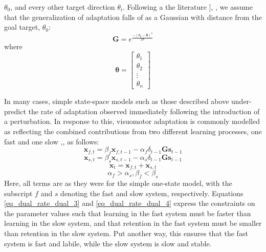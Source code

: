 \documentclass[jou, 11pt, longtable, floatsintext, notab]{apa6}
\begin{document}
$\theta_{0}$, and every other target direction $\theta_{i}$.
Following a the literature \cite{brayanov_motor_2012}],
\cite{poggio_generalization_2004}, we assume that the
generalization of adaptation falls of as a Gaussian with
distance from the goal target, $\theta_{0}$:
\begin{equation}
  \boldsymbol{G} = e^{\frac{-(\theta_{0} - \boldsymbol{\theta})^2}{2 \sigma}}
\end{equation}
where
\begin{equation}
\boldsymbol{\theta} = \begin{bmatrix} \theta_1 \\ \theta_2 \\ \vdots \\ \theta_n \end{bmatrix}
\end{equation}

In many cases, simple state-space models such as those
described above under-predict the rate of adaptation
observed immediately following the introduction of a
perturbation. In response to this, visuomotor adaptation is
commonly modelled as reflecting the combined contributions
from two different learning processes, one fast and one slow
\cite{smith_interacting_2006},\cite{mcdougle_taking_2016},
as follows:
\begin{equation}
  \boldsymbol{x}_{f, t} = \beta_{f} \boldsymbol{x}_{f,
    t-1} - \alpha_{f} \delta_{t-1} \boldsymbol{G} \boldsymbol{s}_{t-1}
  \label{eq_dual_rate_dual_1}
\end{equation}
\begin{equation}
    \boldsymbol{x}_{s, t} = \beta_{s} \boldsymbol{x}_{s,
      t-1} - \alpha_{s} \delta_{t-1} \boldsymbol{G} \boldsymbol{s}_{t-1}
    \label{eq_dual_rate_dual_2}
\end{equation}
\begin{equation}
  \boldsymbol{x}_{t} = \boldsymbol{x}_{f, t} + \boldsymbol{x}_{s, t}
  \label{eq_dual_rate_dual_3}
\end{equation}
\begin{equation}
  \alpha_{f} > \alpha_{s}, \beta_{f} < \beta_{s}
  \label{eq_dual_rate_dual_4}
\end{equation}
Here, all terms are as they were for the simple one-state
model, with the subscript $f$ and $s$ denoting the fast and
slow system, respectively. Equations
\ref{eq_dual_rate_dual_3} and \ref{eq_dual_rate_dual_4}
express the constraints on the parameter values such that
learning in the fast system must be faster than learning in
the slow system, and that retention in the fast system must
be smaller than retention in the slow system. Put another
way, this ensures that the fast system is fast and labile,
while the slow system is slow and stable.
\end{document}
